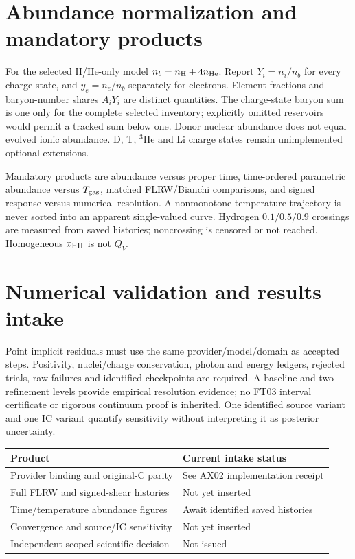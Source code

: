\documentclass[11pt]{article}
\begin{document}
\section{Abundance normalization and mandatory products}
For the selected H/He-only model $n_b=n_{\rm H}+4n_{\rm He}$. Report $Y_i=n_i/n_b$ for every charge state, and $y_e=n_e/n_b$ separately for electrons. Element fractions and baryon-number shares $A_iY_i$ are distinct quantities. The charge-state baryon sum is one only for the complete selected inventory; explicitly omitted reservoirs would permit a tracked sum below one. Donor nuclear abundance does not equal evolved ionic abundance. D, T, $^3$He and Li charge states remain unimplemented optional extensions.

Mandatory products are abundance versus proper time, time-ordered parametric abundance versus $T_{\rm gas}$, matched FLRW/Bianchi comparisons, and signed response versus numerical resolution. A nonmonotone temperature trajectory is never sorted into an apparent single-valued curve. Hydrogen $0.1/0.5/0.9$ crossings are measured from saved histories; noncrossing is censored or not reached. Homogeneous $x_{\rm HII}$ is not $Q_V$.

\section{Numerical validation and results intake}
Point implicit residuals must use the same provider/model/domain as accepted steps. Positivity, nuclei/charge conservation, photon and energy ledgers, rejected trials, raw failures and identified checkpoints are required. A baseline and two refinement levels provide empirical resolution evidence; no FT03 interval certificate or rigorous continuum proof is inherited. One identified source variant and one IC variant quantify sensitivity without interpreting it as posterior uncertainty.

\begin{center}
\begin{tabular}{ll}\toprule
Product & Current intake status\\\midrule
Provider binding and original-C parity & See AX02 implementation receipt\\
Full FLRW and signed-shear histories & Not yet inserted\\
Time/temperature abundance figures & Await identified saved histories\\
Convergence and source/IC sensitivity & Not yet inserted\\
Independent scoped scientific decision & Not issued\\\bottomrule
\end{tabular}
\end{center}
\end{document}
